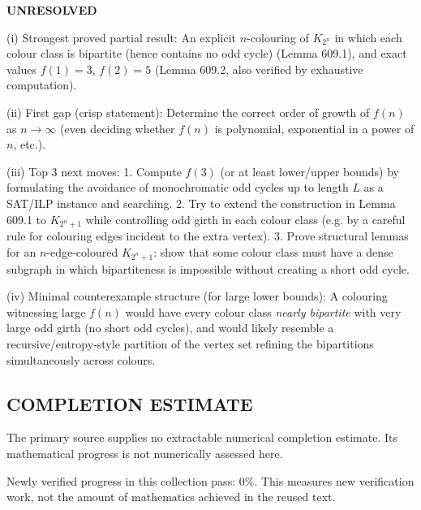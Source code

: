 \textbf{UNRESOLVED}

(i) Strongest proved partial result:
An explicit $n$-colouring of $K_{2^n}$ in which each colour class is bipartite (hence contains no odd cycle) (Lemma 609.1), and exact values $f(1)=3$, $f(2)=5$ (Lemma 609.2, also verified by exhaustive computation).

(ii) First gap (crisp statement):
Determine the correct order of growth of $f(n)$ as $n\to\infty$ (even deciding whether $f(n)$ is polynomial, exponential in a power of $n$, etc.).

(iii) Top 3 next moves:
1. Compute $f(3)$ (or at least lower/upper bounds) by formulating the avoidance of monochromatic odd cycles up to length $L$ as a SAT/ILP instance and searching.
2. Try to extend the construction in Lemma 609.1 to $K_{2^n+1}$ while controlling odd girth in each colour class (e.g. by a careful rule for colouring edges incident to the extra vertex).
3. Prove structural lemmas for an $n$-edge-coloured $K_{2^n+1}$: show that some colour class must have a dense subgraph in which bipartiteness is impossible without creating a short odd cycle.

(iv) Minimal counterexample structure (for large lower bounds):
A colouring witnessing large $f(n)$ would have every colour class \emph{nearly bipartite} with very large odd girth (no short odd cycles), and would likely resemble a recursive/entropy-style partition of the vertex set refining the bipartitions simultaneously across colours.




\subsection*{COMPLETION ESTIMATE}
The primary source supplies no extractable numerical completion estimate. Its mathematical progress is not numerically assessed here.

Newly verified progress in this collection pass: $0\%$. This measures new verification work, not the amount of mathematics achieved in the reused text.
